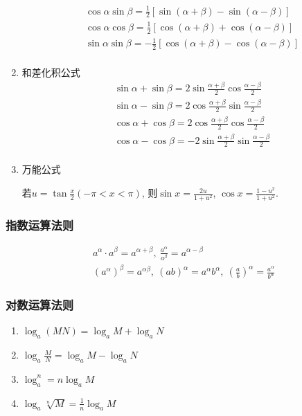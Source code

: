 \begin{enumerate}
\[\begin{split}
                  & \cos\alpha\sin\beta = \frac{1}{2}[\sin(\alpha + \beta) - \sin(\alpha - \beta)] \\
                  & \cos\alpha\cos\beta = \frac{1}{2}[\cos(\alpha + \beta) + \cos(\alpha - \beta)] \\
                  & \sin\alpha\sin\beta = -\frac{1}{2}[\cos(\alpha + \beta) - \cos(\alpha - \beta)] \\
              \end{split} \]
    \item 和差化积公式
          \[ \begin{split}
                  & \sin\alpha + \sin\beta = 2\sin\frac{\alpha+\beta}{2}\cos\frac{\alpha - \beta}{2} \\
                  & \sin\alpha - \sin\beta = 2\cos\frac{\alpha+\beta}{2}\sin\frac{\alpha - \beta}{2} \\
                  & \cos\alpha + \cos\beta = 2\cos\frac{\alpha+\beta}{2}\cos\frac{\alpha - \beta}{2} \\
                  & \cos\alpha - \cos\beta = -2\sin\frac{\alpha+\beta}{2}\sin\frac{\alpha - \beta}{2} \\
              \end{split} \]
    \item 万能公式\par
          若$ u=\tan \frac{x}{2}(-\pi<x<\pi) $, 则$ \sin x=\frac{2u}{1+u^{2}} $, $ \cos x=\frac{1-u^{2}}{1+u^{2}} $.
\end{enumerate}
\subsubsection{指数运算法则}
\vspace*{-2em}
\[ \begin{split}
        & a^{\alpha}\cdot a^{\beta}=a^{\alpha + \beta},\  \frac{a^{\alpha}}{a^{\beta}}=a^{\alpha-\beta} \\
        & (a^{\alpha})^{\beta}=a^{\alpha \beta},\ (ab)^{\alpha}=a^{\alpha}b^{\alpha},\ (\frac{a}{b})^{\alpha}=\frac{a^{\alpha}}{b^{\alpha}}
    \end{split} \]
\subsubsection{对数运算法则}
\begin{enumerate}
    \item $ \log_{a}(MN)=\log_{a}M+\log_{a}N  $
    \item $ \log_{a}\frac{M}{N}=\log_{a}M-\log_{a}N $
    \item $ \log_{a}^{n}=n\log_{a}M $
    \item $ \log_{a}\sqrt[n]{M}=\frac{1}{n}\log_{a}M $
\end{enumerate}
